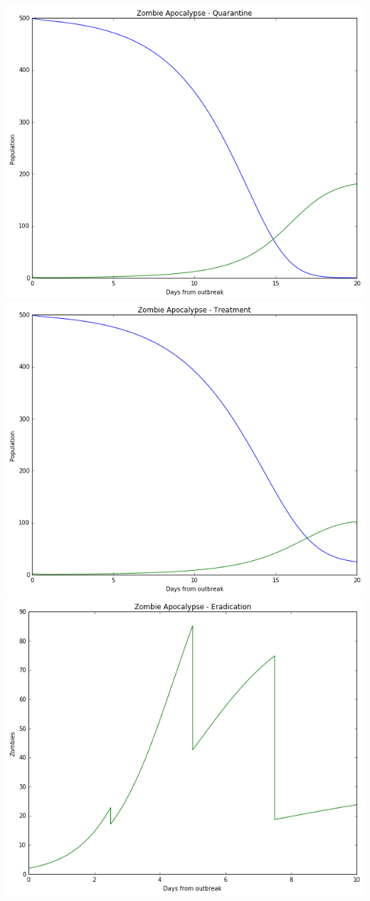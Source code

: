 \documentclass[11pt,spanish]{article}
\begin{document}
\includegraphics[scale=0.8]{q}\\
\includegraphics[scale=0.8]{cure}\\
\includegraphics[scale=0.8]{er}\\
\end{document}
